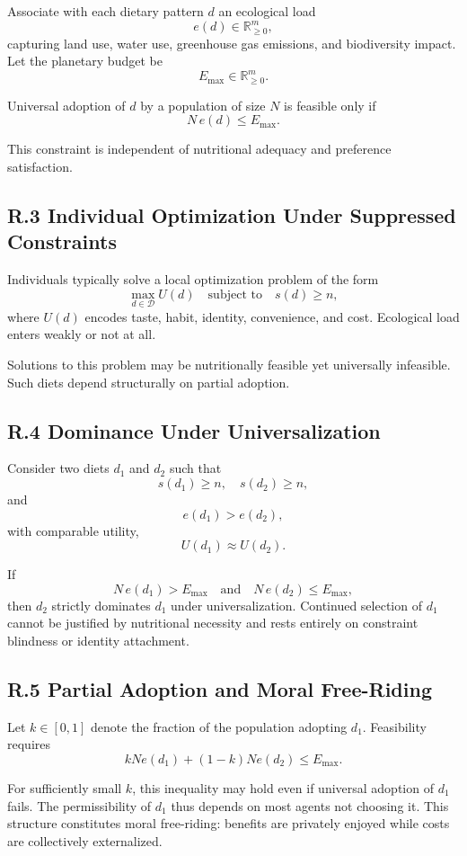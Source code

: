 \documentclass[11pt]{article}
\begin{document}
Associate with each dietary pattern \(d\) an ecological load
\[
e(d) \in \mathbb{R}^m_{\ge 0},
\]
capturing land use, water use, greenhouse gas emissions, and biodiversity impact. Let the planetary budget be
\[
E_{\max} \in \mathbb{R}^m_{\ge 0}.
\]

Universal adoption of \(d\) by a population of size \(N\) is feasible only if
\[
N\, e(d) \le E_{\max}.
\]

This constraint is independent of nutritional adequacy and preference satisfaction.

\subsection{R.3 Individual Optimization Under Suppressed Constraints}

Individuals typically solve a local optimization problem of the form
\[
\max_{d \in \mathcal{D}} U(d)
\quad \text{subject to} \quad s(d) \ge n,
\]
where \(U(d)\) encodes taste, habit, identity, convenience, and cost. Ecological load enters weakly or not at all.

Solutions to this problem may be nutritionally feasible yet universally infeasible. Such diets depend structurally on partial adoption.

\subsection{R.4 Dominance Under Universalization}

Consider two diets \(d_1\) and \(d_2\) such that
\[
s(d_1) \ge n, \quad s(d_2) \ge n,
\]
and
\[
e(d_1) > e(d_2),
\]
with comparable utility,
\[
U(d_1) \approx U(d_2).
\]

If
\[
N\, e(d_1) > E_{\max} \quad \text{and} \quad N\, e(d_2) \le E_{\max},
\]
then \(d_2\) strictly dominates \(d_1\) under universalization. Continued selection of \(d_1\) cannot be justified by nutritional necessity and rests entirely on constraint blindness or identity attachment.

\subsection{R.5 Partial Adoption and Moral Free-Riding}

Let \(k \in [0,1]\) denote the fraction of the population adopting \(d_1\). Feasibility requires
\[
k N e(d_1) + (1-k) N e(d_2) \le E_{\max}.
\]

For sufficiently small \(k\), this inequality may hold even if universal adoption of \(d_1\) fails. The permissibility of \(d_1\) thus depends on most agents not choosing it. This structure constitutes moral free-riding: benefits are privately enjoyed while costs are collectively externalized.
\end{document}
